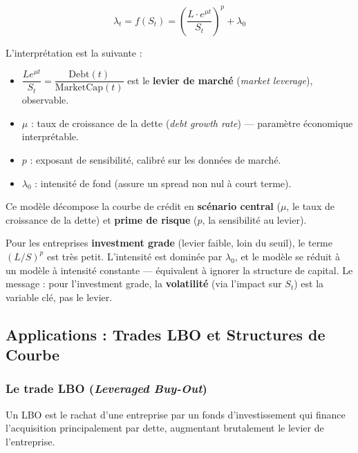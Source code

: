 \begin{tcolorbox}[colback=blue!5,colframe=blue!40,title=Modèle d'intensité de Duffie]
\[
\lambda_t = f(S_t) = \left(\frac{L \cdot e^{\mu t}}{S_t}\right)^p + \lambda_0
\]
\end{tcolorbox}

L'interprétation est la suivante :
\begin{itemize}
    \item $\dfrac{L e^{\mu t}}{S_t} = \dfrac{\mathrm{Debt}(t)}{\mathrm{MarketCap}(t)}$ est le \textbf{levier de marché} (\textit{market leverage}), observable.
    \item $\mu$ : taux de croissance de la dette (\textit{debt growth rate}) — paramètre économique interprétable.
    \item $p$ : exposant de sensibilité, calibré sur les données de marché.
    \item $\lambda_0$ : intensité de fond (assure un spread non nul à court terme).
\end{itemize}

Ce modèle décompose la courbe de crédit en \textbf{scénario central} ($\mu$, le taux de croissance de la dette) et \textbf{prime de risque} ($p$, la sensibilité au levier).

\begin{remarque}
Pour les entreprises \textbf{investment grade} (levier faible, loin du seuil), le terme $(L/S)^p$ est très petit. L'intensité est dominée par $\lambda_0$, et le modèle se réduit à un modèle à intensité constante — équivalent à ignorer la structure de capital. Le message : pour l'investment grade, la \textbf{volatilité} (via l'impact sur $S_t$) est la variable clé, pas le levier.
\end{remarque}

\subsection{Applications : Trades LBO et Structures de Courbe}

\subsubsection{Le trade LBO (\textit{Leveraged Buy-Out})}

Un LBO est le rachat d'une entreprise par un fonds d'investissement qui finance l'acquisition principalement par dette, augmentant brutalement le levier de l'entreprise.

